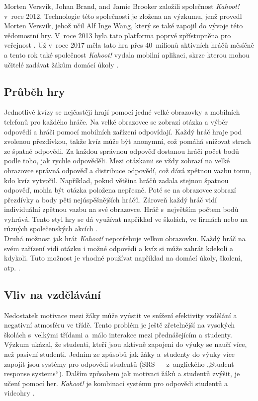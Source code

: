 \documentclass[12pt]{report}
\begin{document}
Morten Versvik, Johan Brand, and Jamie Brooker založili společnost \textit{Kahoot!} v~roce 2012. Technologie této společnosti je zložena na výzkumu, jenž provedl Morten Versvik, jehož učil Alf Inge Wang, který se také zapojil do vývoje této vědomostní hry. V~roce 2013 byla tato platforma poprvé zpřístupněna pro veřejnost \cite{Kahoot2025}. Už v~roce 2017 měla tato hra přes 40~milionů aktivních hráčů měsíčně a tento rok také společnost \textit{Kahoot!} vydala mobilní aplikaci, skrze kterou mohou učitelé zadávat žákům domácí ůkoly  \cite{Keane2017}\cite{Ravipati2017}.

\subsection{Průběh hry}
Jednotlivé kvízy se nejčastěji hrají pomocí jedné velké obrazovky a mobilních telefonů pro každého hráče. Na velké obrazovce se zobrazí otázka a výběr odpovědí a hráči pomocí mobilních zařízení odpovídají. Každý hráč hraje pod zvolenou přezdívkou, takže kvíz může být anonymní, což pomáhá snižovat strach ze špatné odpovědi. Za každou správnou odpověď dostanou hráči počet bodů podle toho, jak rychle odpověděli. Mezi otázkami se vždy zobrazí na velké obrazovce správná odpověď a distribuce odpovědí, což dává zpětnou vazbu tomu, kdo kvíz vytvořil. Například, pokud většina hráčů zadala stejnou špatnou odpověď, mohla být otázka položena nepřesně. Poté se na obrazovce zobrazí přezdívky a body pěti nejúspěšnějších hráčů. Zároveň každý hráč vidí individuální zpětnou vazbu na své obrazovce. Hráč s~největším počtem bodů vyhrává. Tento styl hry se dá využívat například ve školách, ve firmách nebo na různých společenských akcích \cite{Wang2015}.\\

Druhá možnost jak hrát \textit{Kahoot!} nepotřebuje velkou obrazovku. Každý hráč na svém zařízení vidí otázku i možné odpovědi a kvíz si může zahrát kdekoli a kdykoli. Tuto možnost je vhodné používat například na domácí úkoly, školení, atp. \cite{Kahoot2025a}.

\subsection{Vliv na vzdělávání}
Nedostatek motivace mezi žáky může vyústit ve snížení efektivity vzdělání a negativní atmosféru ve třídě. Tento problém je ještě zřetelnější na vysokých školách s~velkými třídami a~málo interakce mezi přednášejícím a studenty. Výzkum ukázal, že studenti, kteří jsou aktivně zapojeni do výuky se naučí více, než pasivní studenti. Jedním ze způsobů jak žáky a~studenty do výuky více zapojit jsou systémy pro odpovědi studentů (SRS — z~anglického „Student response systems“). Dalším způsobem jak motivaci žáků a studentů zvýšit, je učení pomocí her. \textit{Kahoot!} je kombinací systému pro odpovědi studentů a videohry \cite{Wang2020}.\\
\end{document}
